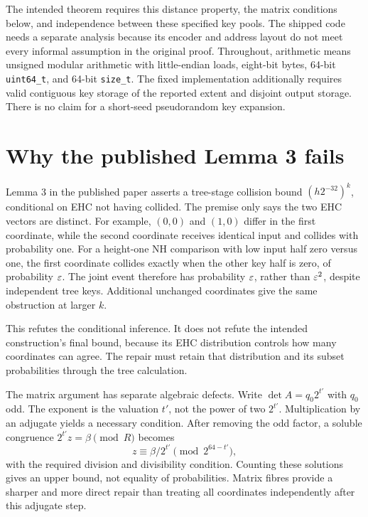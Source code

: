 The intended theorem requires this distance property, the matrix conditions below, and independence between these specified key pools. The shipped code needs a separate analysis because its encoder and address layout do not meet every informal assumption in the original proof. Throughout, arithmetic means unsigned modular arithmetic with little-endian loads, eight-bit bytes, 64-bit \texttt{uint64\_t}, and 64-bit \texttt{size\_t}. The fixed implementation additionally requires valid contiguous key storage of the reported extent and disjoint output storage. There is no claim for a short-seed pseudorandom key expansion.

\section{Why the published Lemma 3 fails}\label{sec:gap}
Lemma 3 in the published paper asserts a tree-stage collision bound $(h2^{-32})^k$, conditional on EHC not having collided\cite[Lemma 3]{apple}. The premise only says the two EHC vectors are distinct. For example, $(0,0)$ and $(1,0)$ differ in the first coordinate, while the second coordinate receives identical input and collides with probability one. For a height-one NH comparison with low input half zero versus one, the first coordinate collides exactly when the other key half is zero, of probability $\varepsilon$. The joint event therefore has probability $\varepsilon$, rather than $\varepsilon^2$, despite independent tree keys. Additional unchanged coordinates give the same obstruction at larger $k$.

This refutes the conditional inference. It does not refute the intended construction's final bound, because its EHC distribution controls how many coordinates can agree. The repair must retain that distribution and its subset probabilities through the tree calculation.

The matrix argument has separate algebraic defects\cite{second}. Write $\det A=q_0 2^{t'}$ with $q_0$ odd. The exponent is the valuation $t'$, not the power of two $2^{t'}$. Multiplication by an adjugate yields a necessary condition. After removing the odd factor, a soluble congruence $2^{t'}z=\beta\pmod R$ becomes
\[
 z\equiv\beta/2^{t'}\pmod{2^{64-t'}},
\]
with the required division and divisibility condition. Counting these solutions gives an upper bound, not equality of probabilities. Matrix fibres provide a sharper and more direct repair than treating all coordinates independently after this adjugate step.

